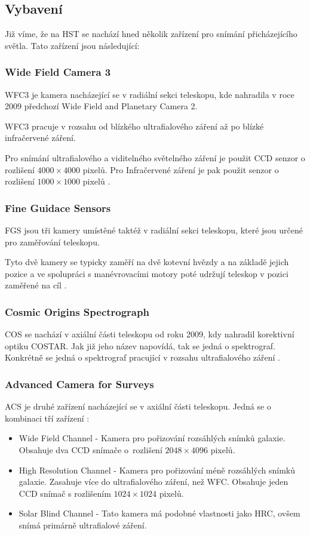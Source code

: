\documentclass[a4paper,11pt]{article}
\begin{document}
\subsection{Vybavení}
Již víme, že na HST se nachází hned několik zařízení pro snímání přicházejícího světla. Tato zařízení jsou následující:
\subsubsection{Wide Field Camera 3}
WFC3 je kamera nacházející se v radiální sekci teleskopu, kde nahradila v roce 2009 předchozí Wide Field and Planetary Camera 2.

WFC3 pracuje v rozsahu od blízkého ultrafialového záření až po blízké infračervené záření.

Pro snímání ultrafialového a viditelného světelného záření je použit CCD senzor o rozlišení $4000 \times 4000$ pixelů. Pro Infračervené záření je pak použit senzor o rozlišení $1000 \times 1000$ pixelů \cite{ballWfc3}.

\subsubsection{Fine Guidace Sensors}
FGS jsou tři kamery umístěné taktéž v radiální sekci teleskopu, které jsou určené pro zaměřování teleskopu.

Tyto dvě kamery se typicky zaměří na dvě kotevní hvězdy a na základě jejich pozice a ve spolupráci s manévrovacími motory poté udržují teleskop v pozici zaměřené na cíl \cite{hubblesiteFgs}.

\subsubsection{Cosmic Origins Spectrograph}
COS se nachází v axiální části teleskopu od roku 2009, kdy nahradil korektivní optiku COSTAR. Jak již jeho název napovídá, tak se jedná o spektrograf. Konkrétně se jedná o spektrograf pracující v rozsahu ultrafialového záření \cite{hubblesiteCos}.

\subsubsection{Advanced Camera for Surveys}
ACS je druhé zařízení nacházející se v axiální části teleskopu. Jedná se o kombinaci tří zařízení \cite{stsciDetectors}:
\begin{itemize}
	\item Wide Field Channel - Kamera pro pořizování rozsáhlých snímků galaxie. Obsahuje dva CCD snímače o~rozlišení $2048 \times 4096$ pixelů.
	\item High Resolution Channel - Kamera pro pořizování méně rozsáhlých snímků galaxie. Zasahuje více do ultrafialového záření, než WFC. Obsahuje jeden CCD snímač s rozlišením $1024 \times 1024$ pixelů.
	\item Solar Blind Channel - Tato kamera má podobné vlastnosti jako HRC, ovšem snímá primárně ultrafialové záření.
\end{itemize}
\end{document}
